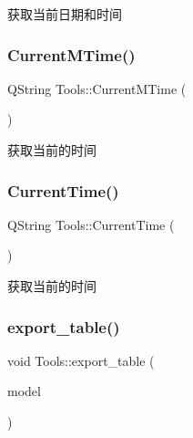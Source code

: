 获取当前日期和时间 

\mbox{\label{class_tools_a70173de28152ff05b140b9895de99e20}} 
\subsubsection{\texorpdfstring{CurrentMTime()}{CurrentMTime()}}
{\footnotesize\ttfamily Q\+String Tools\+::\+Current\+M\+Time (\begin{DoxyParamCaption}{ }\end{DoxyParamCaption})}



获取当前的时间 

\mbox{\label{class_tools_af10c90501143838d9af896a60026668d}} 
\subsubsection{\texorpdfstring{CurrentTime()}{CurrentTime()}}
{\footnotesize\ttfamily Q\+String Tools\+::\+Current\+Time (\begin{DoxyParamCaption}{ }\end{DoxyParamCaption})}



获取当前的时间 

\mbox{\label{class_tools_af6c4eaadfb21ee231cbc4d6384250629}} 
\subsubsection{\texorpdfstring{export\_table()}{export\_table()}}
{\footnotesize\ttfamily void Tools\+::export\+\_\+table (\begin{DoxyParamCaption}\item[{const Q\+Abstract\+Item\+Model \&}]{model }\end{DoxyParamCaption})}

\mbox{\label{class_tools_ac18eb440bd7a33e8e242df2cc4d4d4bc}} 

